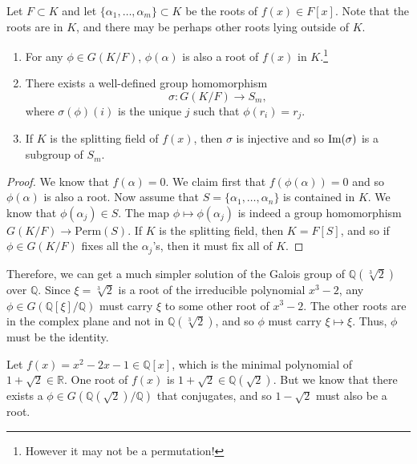   \begin{lemma}
    \label{thm:f_auto_permute}
    Let $F \subset K$ and let $\{\alpha_1, \ldots, \alpha_m\} \subset K$ be the roots of $f(x) \in F[x]$. Note that the roots are in $K$, and there may be perhaps other roots lying outside of $K$. 
    \begin{enumerate}
      \item For any $\phi \in G(K/F)$, $\phi(\alpha)$ is also a root of $f(x)$ in $K$.\footnote{However it may not be a permutation!}

      \item There exists a well-defined group homomorphism 
      \begin{equation}
        \sigma: G(K/F) \to S_m, 
      \end{equation}
      where $\sigma(\phi)(i)$ is the unique $j$ such that $\phi(r_i) = r_j$. 

      \item If $K$ is the splitting field of $f(x)$, then $\sigma$ is injective and so $\operatorname{Im}(\sigma)$ is a subgroup of $S_m$. 
    \end{enumerate}
  \end{lemma}
  \begin{proof}
    We know that $f(\alpha) = 0$. We claim first that $f(\phi(\alpha)) = 0$ and so $\phi(\alpha)$ is also a root. Now assume that $S = \{\alpha_1, \ldots, \alpha_n\}$ is contained in $K$. We know that $\phi(\alpha_j) \in S$. The map $\phi \mapsto \phi(\alpha_j)$ is indeed a group homomorphism $G(K/F) \to \mathrm{Perm}(S)$. If $K$ is the splitting field, then $K = F[S]$, and so if $\phi \in G(K/F)$ fixes all the $\alpha_j$'s, then it must fix all of $K$. 
  \end{proof} 

  \begin{example}
    Therefore, we can get a much simpler solution of the Galois group of $\mathbb{Q}(\sqrt[3]{2})$ over $\mathbb{Q}$. Since $\xi = \sqrt[3]{2}$ is a root of the irreducible polynomial $x^3 - 2$, any $\phi \in G(\mathbb{Q}[\xi]/\mathbb{Q})$ must carry $\xi$ to some other root of $x^3 - 2$. The other roots are in the complex plane and not in $\mathbb{Q}(\sqrt[3]{2})$, and so $\phi$ must carry $\xi \mapsto \xi$. Thus, $\phi$ must be the identity. 
  \end{example}

  \begin{example}
    Let $f(x) = x^2 - 2x - 1 \in \mathbb{Q}[x]$, which is the minimal polynomial of $1 + \sqrt{2} \in \mathbb{R}$. One root of $f(x)$ is $1 + \sqrt{2} \in \mathbb{Q}(\sqrt{2})$. But we know that there exists a $\phi \in G(\mathbb{Q}(\sqrt{2})/\mathbb{Q})$ that conjugates, and so $1 - \sqrt{2}$ must also be a root. 
  \end{example} 

